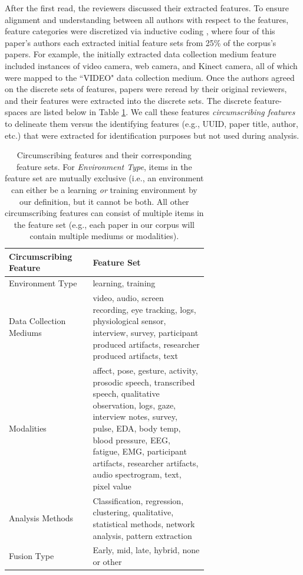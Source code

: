 \documentclass[manuscript,screen,review]{acmart}
\begin{document}
After the first read, the reviewers discussed their extracted features. To ensure alignment and understanding between all authors with respect to the features, feature categories were discretized via inductive coding \cite{}, where four of this paper's authors each extracted initial feature sets from 25\% of the corpus's papers. For example, the initially extracted data collection medium feature included instances of video camera, web camera, and Kinect camera, all of which were mapped to the ``VIDEO" data collection medium. Once the authors agreed on the discrete sets of features, papers were reread by their original reviewers, and their features were extracted into the discrete sets. The discrete feature-spaces are listed below in Table \ref{tab:circumscribing_features}. We call these features \textit{circumscribing features} to delineate them versus the identifying features (e.g., UUID, paper title, author, etc.) that were extracted for identification purposes but not used during analysis. 

\begin{table}[htbp]
    \renewcommand{\arraystretch}{1.3}%
    \centering
    \caption{Circumscribing features and their corresponding feature sets. For \textit{Environment Type}, items in the feature set are mutually exclusive (i.e., an environment can either be a learning \textit{or} training environment by our definition, but it cannot be both. All other circumscribing features can consist of multiple items in the feature set (e.g., each paper in our corpus will contain multiple mediums or modalities).}
    \begin{tabular}{p{0.22\linewidth}@{\hskip .1in} | @{\hskip .1in}p{0.45\linewidth}@{\hskip .1in}}
        \toprule
        Circumscribing Feature & Feature Set\\
        
        \toprule
        Environment Type & learning, training\\
        Data Collection Mediums & video, audio, screen recording, eye tracking, logs, physiological sensor, interview, survey, participant produced artifacts, researcher produced artifacts, text\\
        Modalities & affect, pose, gesture, activity, prosodic speech, transcribed speech, qualitative observation, logs, gaze, interview notes, survey, pulse, EDA, body temp, blood pressure, EEG, fatigue, EMG, participant artifacts, researcher artifacts, audio spectrogram, text, pixel value\\
        Analysis Methods & Classification, regression, clustering, qualitative, statistical methods, network analysis, pattern extraction \\
        Fusion Type & Early, mid, late, hybrid, none or other\\

        \bottomrule
    \end{tabular}
    \label{tab:circumscribing_features}
\end{table}
\end{document}
